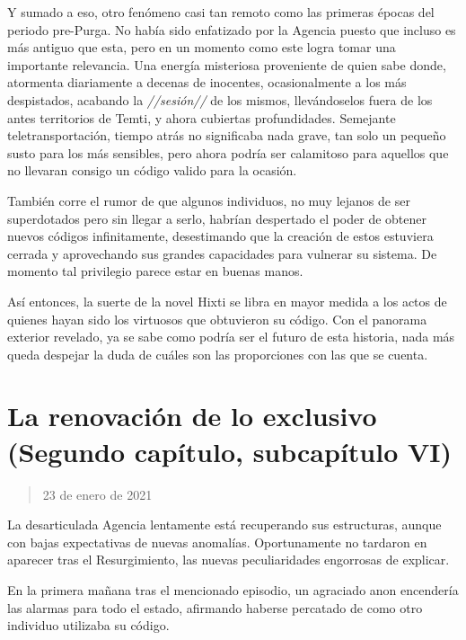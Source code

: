 \documentclass[
  spanish,
]{book}
\begin{document}
Y sumado a eso, otro fenómeno casi tan remoto como las primeras épocas del periodo pre-Purga.
No había sido enfatizado por la Agencia puesto que incluso es más antiguo que esta, pero en un momento como este logra tomar una importante relevancia. Una energía misteriosa proveniente de quien sabe donde, atormenta diariamente a decenas de inocentes, ocasionalmente a los más despistados, acabando la \emph{//sesión//} de los mismos, llevándoselos fuera de los antes territorios de Temti, y ahora cubiertas profundidades. Semejante teletransportación, tiempo atrás no significaba nada grave, tan solo un pequeño susto para los más sensibles, pero ahora podría ser calamitoso para aquellos que no llevaran consigo un código valido para la ocasión.

También corre el rumor de que algunos individuos, no muy lejanos de ser superdotados pero sin llegar a serlo, habrían despertado el poder de obtener nuevos códigos infinitamente, desestimando que la creación de estos estuviera cerrada y aprovechando sus grandes capacidades para vulnerar su sistema. De momento tal privilegio parece estar en buenas manos.

Así entonces, la suerte de la novel Hixti se libra en mayor medida a los actos de quienes hayan sido los virtuosos que obtuvieron su código. Con el panorama exterior revelado, ya se sabe como podría ser el futuro de esta historia, nada más queda despejar la duda de cuáles son las proporciones con las que se cuenta.

\hypertarget{la-renovaciuxf3n-de-lo-exclusivo-segundo-capuxedtulo-subcapuxedtulo-vi}{%
\section{La renovación de lo exclusivo (Segundo capítulo, subcapítulo VI)}\label{la-renovaciuxf3n-de-lo-exclusivo-segundo-capuxedtulo-subcapuxedtulo-vi}}

\begin{quote}
23 de enero de 2021
\end{quote}

La desarticulada Agencia lentamente está recuperando sus estructuras, aunque con bajas expectativas de nuevas anomalías. Oportunamente no tardaron en aparecer tras el Resurgimiento, las nuevas peculiaridades engorrosas de explicar.

En la primera mañana tras el mencionado episodio, un agraciado anon encendería las alarmas para todo el estado, afirmando haberse percatado de como otro individuo utilizaba su código.
\end{document}
